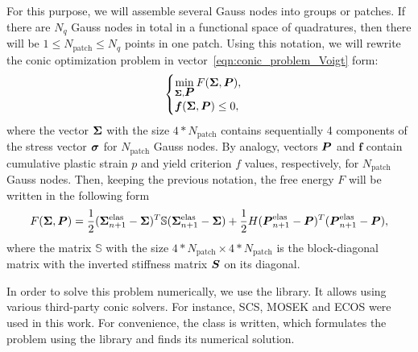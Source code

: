 \documentclass[12pt]{article}
\begin{document}
For this purpose, we will assemble several Gauss nodes into groups or patches. If there are $N_q$ Gauss nodes in total in a functional space of quadratures, then there will be $1 \leq N_\text{patch} \leq N_q$ points in one patch. Using this notation, we will rewrite the conic optimization problem in vector~\eqref{eqn:conic_problem_Voigt} form:
\begin{equation}
    \label{eqn:conic_problem_vectorized}
    \begin{cases}
        \min\limits_{\bm{\Sigma}, \mbox{\boldmath $P$}} F(\bm{\Sigma}, \mbox{\boldmath $P$}), \\
        \mbox{\boldmath $f$}(\bm{\Sigma}, \mbox{\boldmath $P$}) \leq 0,
    \end{cases}
\end{equation}
where the vector $\bm{\Sigma}$ with the size $4*N_\text{patch}$ contains sequentially 4 components of the stress vector $\mbox{\boldmath $\sigma$}$ for $N_\text{patch}$ Gauss nodes. By analogy, vectors $\mbox{\boldmath $P$}$ and $\mathbold{f}$ contain cumulative plastic strain $p$ and yield criterion $f$ values, respectively, for $N_\text{patch}$ Gauss nodes. Then, keeping the previous notation, the free energy $F$ will be written in the following form 
\begin{equation}
    F(\bm{\Sigma}, \mbox{\boldmath $P$}) = \frac{1}{2}(\bm{\Sigma}_{n+1}^\text{elas} - \bm{\Sigma})^T \mathbb{S} (\bm{\Sigma}_{n+1}^\text{elas} - \bm{\Sigma}) + \frac{1}{2}H(\mbox{\boldmath $P$}_{n+1}^\text{elas} - \mbox{\boldmath $P$})^T(\mbox{\boldmath $P$}_{n+1}^\text{elas} - \mbox{\boldmath $P$}),
\end{equation}
where the matrix $\mathbb{S}$ with the size $4*N_\text{patch}\times4*N_\text{patch}$ is the block-diagonal matrix with the inverted stiffness matrix $\mbox{\boldmath $S$}$ on its diagonal.

In order to solve this problem numerically, we use the  library. It allows using various third-party conic solvers. For instance, SCS, MOSEK and ECOS were used in this work. For convenience, the  class is written, which formulates the problem using the  library and finds its numerical solution.
\end{document}
